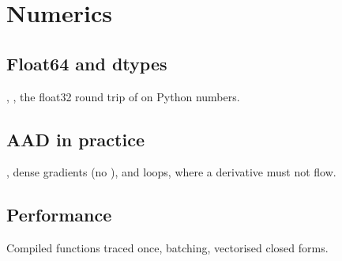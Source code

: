 \section{Numerics}\label{sec:arch-numerics}

\subsection{Float64 and dtypes}\label{sec:arch-dtypes}
, , the float32 round trip of  on Python numbers.

\pending

\subsection{AAD in practice}\label{sec:arch-aad}
, dense gradients (no ),  and loops,
 where a derivative must not flow.

\pending

\subsection{Performance}\label{sec:arch-performance}
Compiled functions traced once, batching, vectorised closed forms.

\pending
